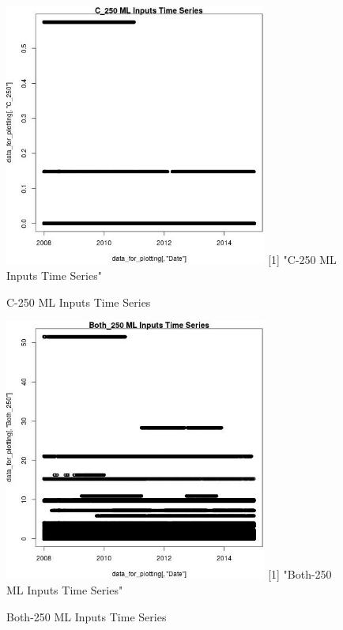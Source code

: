 \begin{figure} 
\centering  
\includegraphics[width=0.77\textwidth]{Code_Outputs/ML_input_report_ML_input_PM25_Step5_part_d_de_duplicated_aves_ML_input_C_250TS.jpg} 
[1] "C-250 ML Inputs Time Series"
\caption{\label{fig:ML_input_report_ML_input_PM25_Step5_part_d_de_duplicated_aves_ML_inputC_250TS}C-250 ML Inputs Time Series} 
\end{figure} 
 

\begin{figure} 
\centering  
\includegraphics[width=0.77\textwidth]{Code_Outputs/ML_input_report_ML_input_PM25_Step5_part_d_de_duplicated_aves_ML_input_Both_250TS.jpg} 
[1] "Both-250 ML Inputs Time Series"
\caption{\label{fig:ML_input_report_ML_input_PM25_Step5_part_d_de_duplicated_aves_ML_inputBoth_250TS}Both-250 ML Inputs Time Series} 
\end{figure} 
 

